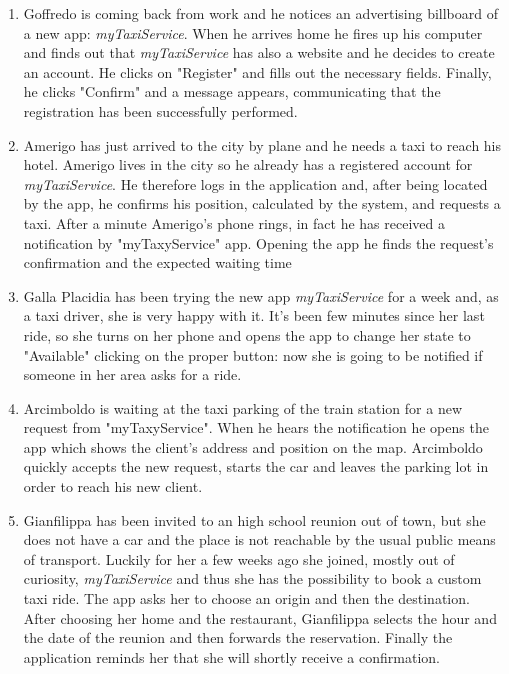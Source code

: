 \documentclass[a4paper]{article}
\begin{document}
    \begin{enumerate}[label=\bfseries S\arabic*:]
        \item Goffredo is coming back from work and he notices an advertising billboard of a new app: \emph{myTaxiService}. When he arrives home he fires up his computer and finds out that \emph{myTaxiService} has also a website and he decides to create an account. He clicks on "Register" and fills out the necessary fields. Finally, he clicks "Confirm" and a message appears, communicating that the registration has been successfully performed.
        \item Amerigo has just arrived to the city by plane and he needs a taxi to reach his hotel. Amerigo lives in the city so he already has a registered account for \emph{myTaxiService}. He therefore logs in the application and, after being located by the app, he confirms his position, calculated by the system, and requests a taxi. After a minute Amerigo's phone rings, in fact he has received a notification by "myTaxyService" app. Opening the app he finds the request's confirmation and the expected waiting time
        \item Galla Placidia has been trying the new app \emph{myTaxiService} for a week and, as a taxi driver, she is very happy with it. It's been few minutes since her last ride, so she turns on her phone and opens the app to change her state to "Available" clicking on the proper button: now she is going to be notified if someone in her area asks for a ride.
        \item Arcimboldo is waiting at the taxi parking of the train station for a new request from "myTaxyService". When he hears the notification he opens the app which shows the client's address and position on the map. Arcimboldo quickly accepts the new request, starts the car and leaves the parking lot in order to reach his new client. 
        \item Gianfilippa has been invited to an high school reunion out of town, but she does not have a car and the place is not reachable by the usual public means of transport. Luckily for her a few weeks ago she joined, mostly out of curiosity, \emph{myTaxiService} and thus she has the possibility to book a custom taxi ride. The app asks her to choose an origin and then the destination. After choosing her home and the restaurant, Gianfilippa selects the hour and the date of the reunion and then forwards the reservation. Finally the application reminds her that she will shortly receive a confirmation.
    \end{enumerate}
    
\end{document}

